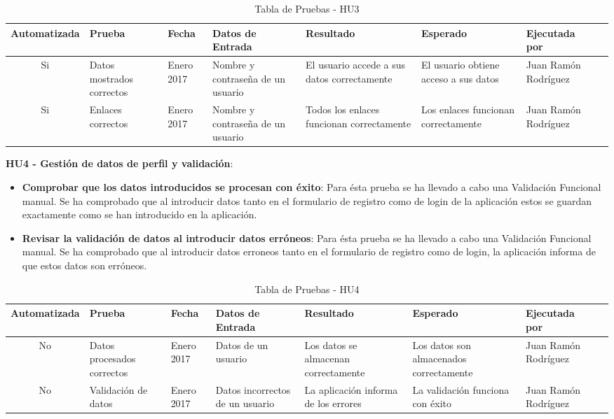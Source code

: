 \documentclass[11pt,openany]{book}
\begin{document}
{\tiny
\setlength{\LTleft}{-20cm plus -1fill}
\setlength{\LTright}{\LTleft}
\begin{center}
\begin{longtable}{| c | M{1.5cm} | M{1.5cm} | M{2.5cm} | M{1.5cm} | M{1.5cm} | M{1.5cm} | M{1.5cm} |}
\caption[Tabla de Pruebas - HU3]{Tabla de Pruebas - HU3} \label{grid_mlmmh} \\

\hline Automatizada & Prueba & Fecha & Datos de Entrada & Resultado & Esperado & Ejecutada por \\
\endfirsthead
\hline
Si & Datos mostrados correctos & Enero 2017 & Nombre y contraseña de un usuario & El usuario accede a sus datos correctamente & El usuario obtiene acceso a sus datos & Juan Ramón Rodríguez \\
\hline
Si & Enlaces correctos & Enero 2017 & Nombre y contraseña de un usuario & Todos los enlaces funcionan correctamente & Los enlaces funcionan correctamente & Juan Ramón Rodríguez \\
\hline
\end{longtable}
\end{center}}
 
\pagebreak
\textbf{HU4 - Gestión de datos de perfil y validación}:
 
\begin{itemize}
\item\textbf{Comprobar que los datos introducidos se procesan con éxito}: Para ésta prueba se ha llevado a cabo una Validación Funcional manual. Se ha comprobado que al introducir datos tanto en el formulario de registro como de login de la aplicación estos se guardan exactamente como se han introducido en la aplicación.
\item\textbf{Revisar la validación de datos al introducir datos erróneos}: Para ésta prueba se ha llevado a cabo una Validación Funcional manual. Se ha comprobado que al introducir datos erroneos tanto en el formulario de registro como de login, la aplicación informa de que estos datos son erróneos.
\end{itemize}

{\tiny
\setlength{\LTleft}{-20cm plus -1fill}
\setlength{\LTright}{\LTleft}
\begin{center}
\begin{longtable}{| c | M{1.5cm} | M{1.5cm} | M{2.5cm} | M{1.5cm} | M{1.5cm} | M{1.5cm} | M{1.5cm} |}
\caption[Tabla de Pruebas - HU4]{Tabla de Pruebas - HU4} \label{grid_mlmmh} \\

\hline Automatizada & Prueba & Fecha & Datos de Entrada & Resultado & Esperado & Ejecutada por \\
\endfirsthead
\hline
No & Datos procesados correctos & Enero 2017 & Datos de un usuario & Los datos se almacenan correctamente & Los datos son almacenados correctamente & Juan Ramón Rodríguez \\
\hline
No & Validación de datos & Enero 2017 & Datos incorrectos de un usuario & La aplicación informa de los errores & La validación funciona con éxito & Juan Ramón Rodríguez \\
\hline
\end{longtable}
\end{center}}
 
\end{document}
